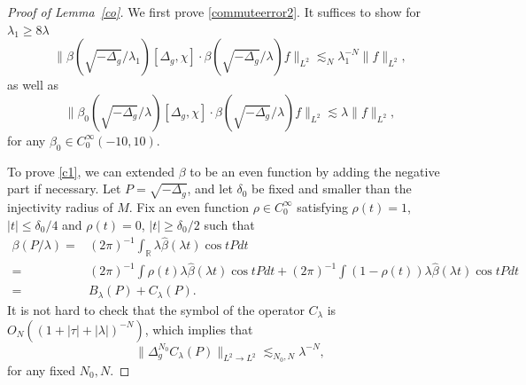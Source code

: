 \documentclass[10pt]{amsart}
\newcommand{\la}{\lambda}
\newcommand{\1}{{\bf 1}}
\newcommand{\R}{{\mathbb R}}
\begin{document}
\begin{proof}[Proof of Lemma~\ref{co}]


We first prove \eqref{commuteerror2}. It suffices to show for $\la_1\ge 8\la$
\begin{equation}\label{c1}
\| \beta(\sqrt{-\Delta_g}/\la_1)[\Delta_g,\chi] \cdot \beta(\sqrt{-\Delta_g}/\la)f\|_{L^2}\lesssim_N \la_1^{-N}\|f\|_{L^2}, 
\end{equation}
as well as 
\begin{equation}\label{c2}
\| \beta_0(\sqrt{-\Delta_g}/\la)[\Delta_g,\chi] \cdot \beta(\sqrt{-\Delta_g}/\la)f\|_{L^2}\lesssim \la\|f\|_{L^2},
\end{equation}
for any $\beta_0\in C_0^\infty(-10,10)$. 

To prove \eqref{c1}, 
 we can extended $\beta$ to be an even function by adding the negative part if necessary. Let $P=\sqrt{-\Delta_g}$, and let $\delta_0$ be fixed and smaller than the injectivity radius of $M$. 
Fix an even function $\rho\in C_0^\infty$   satisfying $\rho(t)= 1$, $|t|\le \delta_0/4$ and $\rho(t)=0 $, $|t|\ge \delta_0/2$ such that
\begin{equation}\label{c3}
\begin{aligned}
     \beta( P/\la)=&(2\pi)^{-1}\int_\R\la\hat \beta(\la t)\cos t P dt \\
     =&(2\pi)^{-1}\int\rho(t)\la\hat \beta(\la t)\cos t P dt+ (2\pi)^{-1}\int (1-\rho(t)) \la\hat \beta(\la t)\cos t P dt\\
     =& B_\la(P)+C_\la(P).
\end{aligned}
\end{equation}
It is not hard to check that the symbol of the operator $C_\la$ is $O_N((1+|\tau|+|\la|)^{-N})$, which implies that 
  \begin{equation}\label{cestimatee}
      \|\Delta_g^{N_0} C_\la(P)\|_{L^2\to L^2}\lesssim_{N_0,N}\la^{-N},
  \end{equation}
 for any fixed $N_0, N$.


  
  

\end{proof}
\end{document}

